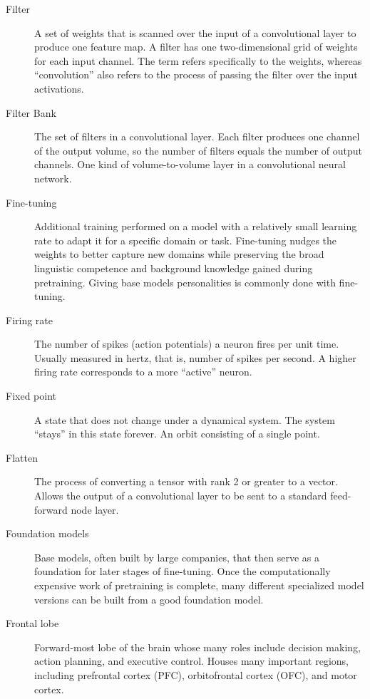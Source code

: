 \begin{description}
\item[Filter] A set of weights that is scanned over the input of a convolutional layer to produce one feature map. A filter has one two-dimensional grid of weights for each input channel. The term refers specifically to the weights, whereas ``convolution'' also refers to the process of passing the filter over the input activations.

\item[Filter Bank] The set of filters in a convolutional layer. Each filter produces one channel of the output volume, so the number of filters equals the number of output channels. One kind of volume-to-volume layer in a convolutional neural network.

\item[Fine-tuning] Additional training performed on a model with a relatively small learning rate to adapt it for a specific domain or task. Fine-tuning nudges the weights to better capture new domains while preserving the broad linguistic competence and background knowledge gained during pretraining. Giving base models personalities is commonly done with fine-tuning.

\item[Firing rate] The number of spikes (action potentials) a neuron fires per unit time. Usually measured in hertz, that is, number of spikes per second. A higher firing rate corresponds to a more ``active'' neuron.

\item[Fixed point] A state that does not change under a dynamical system. The system ``stays'' in this state forever. An orbit consisting of a single point.

\item[Flatten] The process of converting a tensor with rank 2 or greater to a vector.  Allows the output of a convolutional layer to be sent to a standard feed-forward node layer.

\item[Foundation models] Base models, often built by large companies, that then serve as a foundation for later stages of fine-tuning. Once the computationally expensive work of pretraining is complete, many different specialized model versions can be built from a good foundation model.

\item[Frontal lobe] Forward-most lobe of the brain whose many roles include decision making, action planning, and executive control. Houses many important regions, including prefrontal cortex (PFC), orbitofrontal cortex (OFC), and motor cortex.


\end{description}

